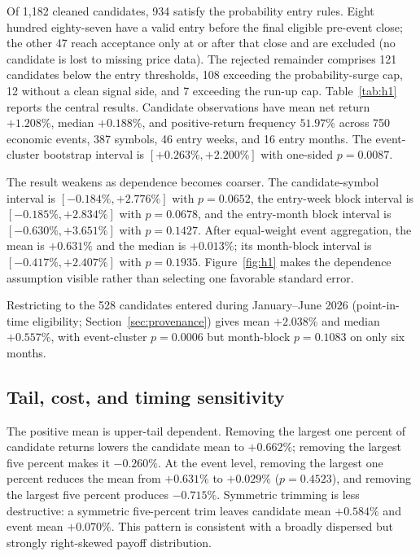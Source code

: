 \documentclass[sigconf,anonymous]{acmart}
\begin{document}
Of 1,182 cleaned candidates, 934 satisfy the probability entry rules. Eight hundred eighty-seven have a valid entry before the final eligible pre-event close; the other 47 reach acceptance only at or after that close and are excluded (no candidate is lost to missing price data). The rejected remainder comprises 121 candidates below the entry thresholds, 108 exceeding the probability-surge cap, 12 without a clean signal side, and 7 exceeding the run-up cap. Table~\ref{tab:h1} reports the central results. Candidate observations have mean net return $+1.208\%$, median $+0.188\%$, and positive-return frequency $51.97\%$ across 750 economic events, 387 symbols, 46 entry weeks, and 16 entry months. The event-cluster bootstrap interval is $[+0.263\%,+2.200\%]$ with one-sided $p=0.0087$.

The result weakens as dependence becomes coarser. The candidate-symbol interval is $[-0.184\%,+2.776\%]$ with $p=0.0652$, the entry-week block interval is $[-0.185\%,+2.834\%]$ with $p=0.0678$, and the entry-month block interval is $[-0.630\%,+3.651\%]$ with $p=0.1427$. After equal-weight event aggregation, the mean is $+0.631\%$ and the median is $+0.013\%$; its month-block interval is $[-0.417\%,+2.407\%]$ with $p=0.1935$. Figure~\ref{fig:h1} makes the dependence assumption visible rather than selecting one favorable standard error.

Restricting to the 528 candidates entered during January--June 2026 (point-in-time eligibility; Section~\ref{sec:provenance}) gives mean $+2.038\%$ and median $+0.557\%$, with event-cluster $p=0.0006$ but month-block $p=0.1083$ on only six months.



\subsection{Tail, cost, and timing sensitivity}

The positive mean is upper-tail dependent. Removing the largest one percent of candidate returns lowers the candidate mean to $+0.662\%$; removing the largest five percent makes it $-0.260\%$. At the event level, removing the largest one percent reduces the mean from $+0.631\%$ to $+0.029\%$ ($p=0.4523$), and removing the largest five percent produces $-0.715\%$. Symmetric trimming is less destructive: a symmetric five-percent trim leaves candidate mean $+0.584\%$ and event mean $+0.070\%$. This pattern is consistent with a broadly dispersed but strongly right-skewed payoff distribution.
\end{document}
